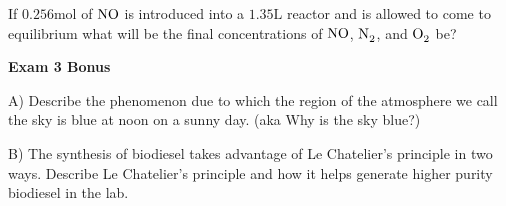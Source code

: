 \documentclass{article}
\begin{document}
    If $0.256 \si{\mole}$ of $\ce{NO}$ is introduced into a $1.35 \si{\liter}$ reactor and is allowed to come to equilibrium what will be the final concentrations of $\ce{NO }$, $\ce{N2}$, and $\ce{O2}$ be?

    \pagebreak

    \begin{center}
        \textbf{Exam 3 Bonus}\\
    \end{center}

    A) Describe the phenomenon due to which the region of the atmosphere we call the sky is blue at noon on a sunny day. (aka Why is the sky blue?)

    B) The synthesis of biodiesel takes advantage of Le Chatelier's principle in two ways. Describe Le Chatelier's principle and how it helps generate higher purity biodiesel in the lab.

\end{document}
